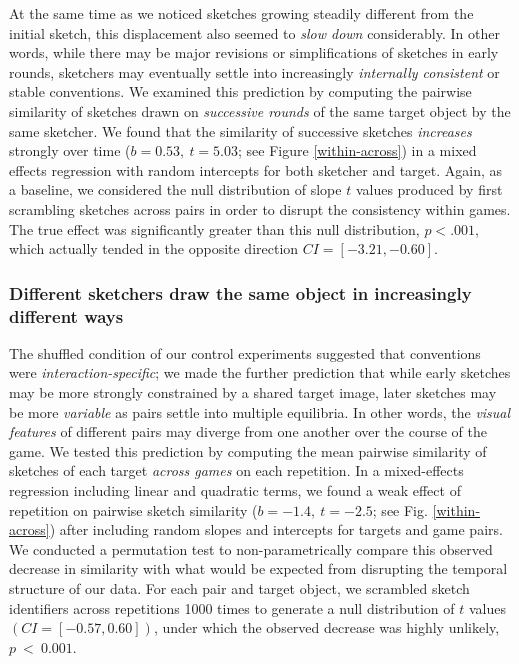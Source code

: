 \documentclass[10pt,letterpaper]{article}
\begin{document}
At the same time as we noticed sketches growing steadily different from the initial sketch, this displacement also seemed to \emph{slow down} considerably.
In other words, while there may be major revisions or simplifications of sketches in early rounds, sketchers may eventually settle into  increasingly \emph{internally consistent} or stable conventions.
We examined this prediction by computing the pairwise similarity of sketches drawn on \emph{successive rounds} of the same target object by the same sketcher. 
We found that the similarity of successive sketches \emph{increases} strongly over time ($b = 0.53,~t = 5.03$; see Figure \ref{within-across}) in a mixed effects regression with random intercepts for both sketcher and target. 
Again, as a baseline, we considered the null distribution of slope $t$ values produced by first scrambling sketches across pairs in order to disrupt the consistency within games.
The true effect was significantly greater than this null distribution, $p < .001$, which actually tended in the opposite direction $CI = [-3.21, -0.60]$. 

\subsubsection{Different sketchers draw the same object in increasingly different ways} 

The shuffled condition of our control experiments suggested that conventions were \emph{interaction-specific}; we made the further prediction that while early sketches may be more strongly constrained by a shared target image, later sketches may be more \emph{variable} as pairs settle into multiple equilibria.
In other words, the \emph{visual features} of different pairs may diverge from one another over the course of the game.
We tested this prediction by computing the mean pairwise similarity of sketches of each target \emph{across games} on each repetition. 
In a mixed-effects regression including linear and quadratic terms, we found a weak effect of repetition on pairwise sketch similarity ($b = -1.4, ~t = -2.5$; see Fig. \ref{within-across})  after including random slopes and intercepts for targets and game pairs. %
We conducted a permutation test to non-parametrically compare this observed decrease in similarity with what would be expected from disrupting the temporal structure of our data.
For each pair and target object, we scrambled sketch identifiers across repetitions 1000 times to generate a null distribution of $t$ values $(CI = [-0.57, 0.60])$, under which the observed decrease was highly unlikely,~$p~<~0.001$.
\end{document}
